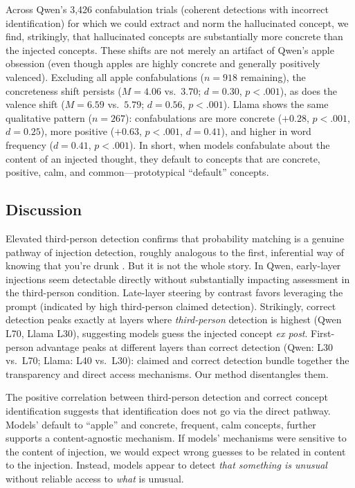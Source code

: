 \documentclass{article}
\begin{document}
Across Qwen's 3,426 confabulation trials (coherent detections with incorrect identification) for which we could extract and norm the hallucinated concept, we find, strikingly, that 
 hallucinated concepts are substantially more concrete than the injected concepts.
These shifts are not merely an artifact of Qwen's apple obsession (even though apples are highly concrete and generally positively valenced). Excluding all apple confabulations ($n = 918$ remaining), the concreteness shift persists ($M = 4.06$ vs.\ $3.70$; $d = 0.30$, $p < .001$), as does the valence shift ($M = 6.59$ vs.\ $5.79$; $d = 0.56$, $p < .001$). Llama shows the same qualitative pattern ($n = 267$): confabulations are more concrete ($+0.28$, $p < .001$, $d = 0.25$), more positive ($+0.63$, $p < .001$, $d = 0.41$), and higher in word frequency ($d = 0.41$, $p < .001$).
In short, when models confabulate about the content of an injected thought, they default to concepts that are concrete, positive, calm, and common---prototypical ``default'' concepts. 

\vspace{-.03in}
\subsection{Discussion}

Elevated third-person detection confirms that probability matching is a genuine pathway of injection detection, roughly analogous to the first, inferential way of knowing that you're drunk  \citep{evans_varieties_1982,byrne_transparency_2018}. But it is not the whole story. In Qwen, early-layer injections seem detectable directly without substantially impacting assessment in the third-person condition. Late-layer steering by contrast favors leveraging the prompt (indicated by high third-person claimed detection). Strikingly, correct detection peaks exactly at layers where \emph{third-person} detection is highest (Qwen L70, Llama L30), suggesting models guess the injected concept \emph{ex post}. First-person advantage peaks at different layers than correct detection (Qwen: L30 vs.\ L70; Llama: L40 vs.\ L30): claimed and correct detection bundle together the transparency and direct access mechanisms. Our method disentangles them.

The positive correlation between third-person detection and correct concept identification suggests that identification does not go via the direct pathway. Models' default to ``apple'' and concrete, frequent, calm concepts, further supports a content-agnostic mechanism. If models' mechanisms were sensitive to the content of injection, we would expect wrong guesses to be related in content to the injection. Instead, models appear to detect \emph{that something is unusual} without reliable access to \emph{what} is unusual. 
\end{document}
